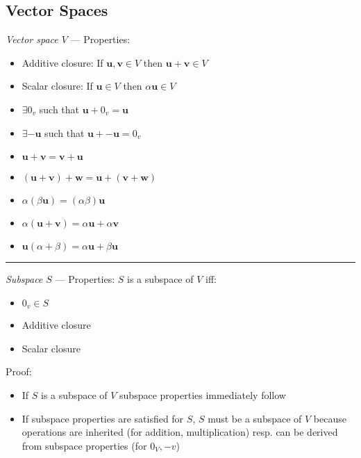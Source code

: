 \subsection*{Vector Spaces}
\emph{Vector space $V$} --- Properties:
\begin{multicols}{2}
\begin{itemize}
    \item Additive closure: If $\boldsymbol{u},\boldsymbol{v} \in V$ then $\boldsymbol{u} + \boldsymbol{v} \in V$ 
    \item Scalar closure: If $\boldsymbol{u} \in V$ then $\alpha\boldsymbol{u} \in V$ 
    \item $\exists 0_v$ such that $\boldsymbol{u} + 0_v = \boldsymbol{u}$
    \item $\exists \boldsymbol{-u}$ such that $\boldsymbol{u} + \boldsymbol{-u} = 0_v$
    \item $\boldsymbol{u} + \boldsymbol{v} = \boldsymbol{v} + \boldsymbol{u}$ 
    \item $(\boldsymbol{u} + \boldsymbol{v}) + \boldsymbol{w} = \boldsymbol{u} + (\boldsymbol{v} + \boldsymbol{w})$ 
    \item $\alpha(\beta\boldsymbol{u})= (\alpha\beta)\boldsymbol{u}$ 
    \item $\alpha(\boldsymbol{u} + \boldsymbol{v}) = \alpha\boldsymbol{u} + \alpha\boldsymbol{v}$ 
    \item $\boldsymbol{u}(\alpha + \beta) = \alpha\boldsymbol{u} + \beta\boldsymbol{u}$ 
\end{itemize}
\end{multicols}

{\color{lightgray}\hrule height 0.001mm}

\emph{Subspace $S$} --- Properties:
$S$ is a subspace of $V$ iff:
\begin{multicols}{2}
\begin{itemize}
    \item $0_v \in S$
    \item Additive closure
    \item Scalar closure
\end{itemize}
\end{multicols}
Proof:
\begin{itemize}
    \item If $S$ is a subspace of $V$ subspace properties immediately follow
    \item If subspace properties are satisfied for $S$, $S$  must be a subspace of $V$ because operations are inherited (for addition, multiplication) resp. can be derived from subspace properties (for $0_V, -v$)
\end{itemize}

